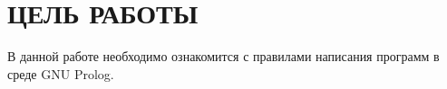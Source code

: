 \section{ЦЕЛЬ РАБОТЫ}

В данной работе необходимо ознакомится с правилами написания программ в среде GNU Prolog.
